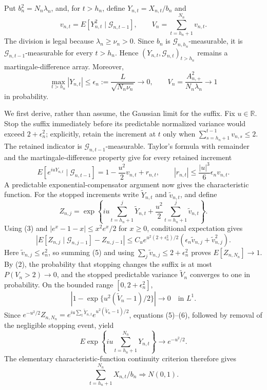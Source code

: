 Put \(b_n^2=N_n\lambda_n\), and, for \(t>h_n\), define \(Y_{n,t}=X_{n,t}/b_n\) and
\[
 v_{n,t}=E[Y_{n,t}^2\mid\mathcal G_{n,t-1}],
 \qquad V_n=\sum_{t=h_n+1}^{N_n}v_{n,t}.
\tag{1}
\]
The division is legal because \(\lambda_n\ge\nu_n>0\). Since \(b_n\) is \(\mathcal G_{n,h_n}\)-measurable, it is \(\mathcal G_{n,t-1}\)-measurable for every \(t>h_n\). Hence \((Y_{n,t},\mathcal G_{n,t})_{t>h_n}\) remains a martingale-difference array. Moreover,
\[
 \max_{t>h_n}|Y_{n,t}|\le
 \epsilon_n:=\frac{L}{\sqrt{N_n\nu_n}}\longrightarrow0,
 \qquad V_n=\frac{A_{n,+}^2}{N_n\lambda_n}\longrightarrow1
\tag{2}
\]
in probability.

We first derive, rather than assume, the Gaussian limit for the suffix. Fix \(u\in\mathbb R\). Stop the suffix immediately before its predictable normalized variance would exceed \(2+\epsilon_n^2\); explicitly, retain the increment at \(t\) only when \(\sum_{s=h_n+1}^{t-1}v_{n,s}\le2\). The retained indicator is \(\mathcal G_{n,t-1}\)-measurable. Taylor's formula with remainder and the martingale-difference property give for every retained increment
\[
 E[e^{iuY_{n,t}}\mid\mathcal G_{n,t-1}]
 =1-\frac{u^2}{2}v_{n,t}+r_{n,t},
 \qquad |r_{n,t}|\le\frac{|u|^3}{6}\epsilon_n v_{n,t}.
\tag{3}
\]
A predictable exponential-compensator argument now gives the characteristic function. For the stopped increments write \(\widetilde Y_{n,t}\) and \(\widetilde v_{n,t}\), and define
\[
 Z_{n,j}=\exp\left\{iu\sum_{t=h_n+1}^j\widetilde Y_{n,t}
 +\frac{u^2}{2}\sum_{t=h_n+1}^j\widetilde v_{n,t}\right\}.
\tag{4}
\]
Using (3) and \(|e^x-1-x|\le x^2e^x/2\) for \(x\ge0\), conditional expectation gives
\[
 \left|E[Z_{n,j}\mid\mathcal G_{n,j-1}]-Z_{n,j-1}\right|
 \le C_u e^{u^2(2+\epsilon_n^2)/2}
 \left(\epsilon_n\widetilde v_{n,j}+\widetilde v_{n,j}^2\right).
 \tag{5}
\]
Here \(\widetilde v_{n,j}\le\epsilon_n^2\), so summing (5) and using \(\sum_j\widetilde v_{n,j}\le2+\epsilon_n^2\) proves \(E[Z_{n,N_n}]\to1\). By (2), the probability that stopping changes the suffix is at most \(P(V_n>2)\to0\), and the stopped predictable variance \(\widetilde V_n\) converges to one in probability. On the bounded range \([0,2+\epsilon_n^2]\),
\[
 \left|1-\exp\{u^2(\widetilde V_n-1)/2\}\right|\longrightarrow0
 \quad\text{in }L^1.
 \tag{6}
\]
Since \(e^{-u^2/2}Z_{n,N_n}=e^{iu\sum_t\widetilde Y_{n,t}}
e^{u^2(\widetilde V_n-1)/2}\), equations (5)--(6), followed by removal of the negligible stopping event, yield
\[
 E\exp\left\{iu\sum_{t=h_n+1}^{N_n}Y_{n,t}\right\}
 \longrightarrow e^{-u^2/2}.
\tag{7}
\]
The elementary characteristic-function continuity criterion therefore gives
\[
 \sum_{t=h_n+1}^{N_n}X_{n,t}/b_n\Rightarrow N(0,1).
\tag{8}
\]

